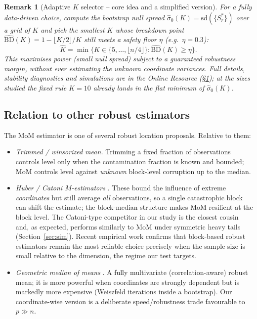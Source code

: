 \documentclass[pdflatex,sn-mathphys-num]{sn-jnl}
\theoremstyle{thmstyleone}%
\theoremstyle{thmstyletwo}%
\newtheorem{remark}{Remark}%
\theoremstyle{thmstylethree}%
\begin{document}
\begin{remark}[Adaptive $K$ selector -- core idea and a simplified version]
\label{rem:adaptK}
For a fully data-driven choice, compute the bootstrap null spread
$\hat\sigma_0(K)=\mathrm{sd}(\{S^{\ast}_r\})$ over a grid of $K$ and pick the
smallest $K$ whose breakdown point
$\widehat{\mathrm{BD}}(K)=1-\lfloor K/2\rfloor/K$ still meets a safety floor
$\eta$ (e.g.\ $\eta=0.3$):
\[
\hat K = \min\bigl\{K\in\{5,\dots,\lfloor n/4\rfloor\} :
\widehat{\mathrm{BD}}(K)\ge \eta\bigr\}.
\]
This maximises power (small null spread) subject to a guaranteed robustness
margin, without ever estimating the unknown coordinate variances. Full details,
stability diagnostics and simulations are in the Online Resource
(\S\ref{rem:adaptK}); at the sizes studied the fixed rule $K=10$ already lands
in the flat minimum of $\hat\sigma_0(K)$.
\end{remark}

\subsection{Relation to other robust estimators}
\label{subsec:robustrel}

The MoM estimator is one of several robust location proposals. Relative to them:
\begin{itemize}
    \item \emph{Trimmed / winsorized mean.} Trimming a fixed fraction of
    observations controls level only when the contamination fraction is
    known and bounded; MoM controls level against \emph{unknown} block-level
    corruption up to the median.
    \item \emph{Huber / Catoni $M$-estimators}
    \citep{huber1964,catoni2012,sun2018}. These bound the influence of extreme
    \emph{coordinates} but still average \emph{all} observations, so a single
    catastrophic block can shift the estimate; the block-median structure makes
    MoM resilient at the block level. The Catoni-type competitor in our study
is the closest cousin and, as expected, performs similarly to MoM under
symmetric heavy tails (Section~\ref{sec:sim}). Recent empirical work
\citep{anderson2025} confirms that block-based robust estimators remain the
most reliable choice precisely when the sample size is small relative to the
dimension, the regime our test targets.
    \item \emph{Geometric median of means} \citep{minsker2015,minsker2025}. A fully
    multivariate (correlation-aware) robust mean; it is more powerful when
    coordinates are strongly dependent but is markedly more expensive
    (Weiszfeld iterations inside a bootstrap). Our coordinate-wise version is a
    deliberate speed/robustness trade favourable to $p\gg n$.
\end{itemize}
\end{document}

